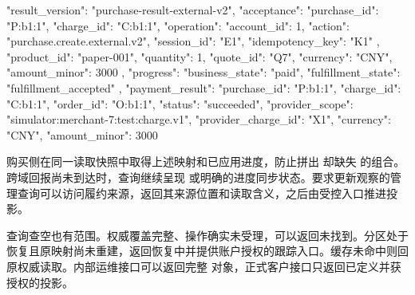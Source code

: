 \begin{BookCode}
{
  "result_version": "purchase-result-external-v2",
  "acceptance": {
    "purchase_id": "P:b1:1",
    "charge_id": "C:b1:1",
    "operation": {
      "account_id": 1,
      "action": "purchase.create.external.v2",
      "session_id": "E1",
      "idempotency_key": "K1"
    },
    "product_id": "paper-001",
    "quantity": 1,
    "quote_id": "Q7",
    "currency": "CNY",
    "amount_minor": 3000
  },
  "progress": {
    "business_state": "paid",
    "fulfillment_state": "fulfillment_accepted"
  },
  "payment_result": {
    "purchase_id": "P:b1:1",
    "charge_id": "C:b1:1",
    "order_id": "O:b1:1",
    "status": "succeeded",
    "provider_scope": "simulator:merchant-7:test:charge.v1",
    "provider_charge_id": "X1",
    "currency": "CNY",
    "amount_minor": 3000
  }
}
\end{BookCode}

购买侧在同一读取快照中取得上述映射和已应用进度，防止拼出  却缺失  的组合。跨域回报尚未到达时，查询继续呈现  或明确的进度同步状态。要求更新观察的管理查询可以访问履约来源，返回其来源位置和读取含义，之后由受控入口推进投影。

查询查空也有范围。权威覆盖完整、操作确实未受理，可以返回未找到。分区处于恢复且原映射尚未重建，返回恢复中并提供账户授权的跟踪入口。缓存未命中则回原权威读取。内部运维接口可以返回完整  对象，正式客户接口只返回已定义并获授权的投影。
